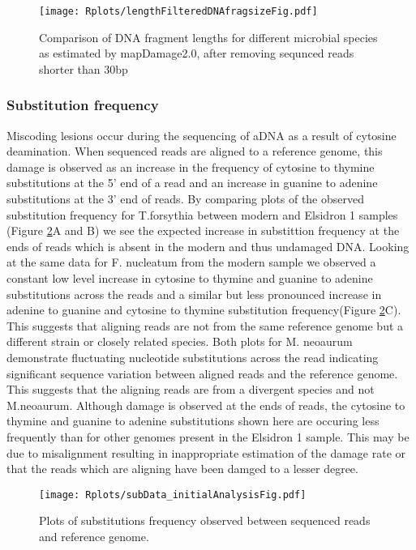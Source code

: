 \documentclass[12pt, a4paper]{article}
\begin{document}
\begin{figure}[ht!]
	\centering
	\texttt{[image: Rplots/lengthFilteredDNAfragsizeFig.pdf]}
	\small\caption{Comparison of DNA fragment lengths for different microbial species as estimated by mapDamage2.0, after removing sequnced reads shorter than 30bp}\label{fig:lengthFilteredDistCompare}
\end{figure}
\clearpage


\subsubsection{Substitution frequency}
Miscoding lesions occur during the sequencing of aDNA as a result of cytosine deamination.
When sequenced reads are aligned to a reference genome, this damage is observed as an increase in the frequency of cytosine to thymine substitutions at the 5' end of a read and an increase in guanine to adenine substitutions at the 3' end of reads.
By comparing plots of the observed substitution frequency for T.forsythia between modern and Elsidron 1 samples (Figure \ref{fig:subDataInitialFig}A and B) we see the expected increase in substittion frequency at the ends of reads which is absent in the modern and thus undamaged DNA.
Looking at the same data for F. nucleatum from the modern sample we observed a constant low level increase in cytosine to thymine and guanine to adenine substitutions across the reads and a similar but less pronounced increase in adenine to guanine and cytosine to thymine substitution frequency(Figure \ref{fig:subDataInitialFig}C). 
This suggests that aligning reads are not from the same reference genome but a different strain or closely related species.
Both plots for M. neoaurum demonstrate fluctuating  nucleotide substitutions across the read indicating significant sequence variation between aligned reads and the reference genome. 
This suggests that the aligning reads are from a divergent species and not M.neoaurum. Although damage is observed at the ends of reads, the cytosine to thymine and guanine to adenine substitutions shown here are occuring less frequently than for other genomes present in the Elsidron 1 sample.
This may be due to misalignment resulting in inappropriate estimation of the damage rate or that the reads which are aligning have been damged to a lesser degree.


\begin{figure}[ht!]
	\centering
	\texttt{[image: Rplots/subData\_initialAnalysisFig.pdf]}
	\small\caption{Plots of substitutions frequency observed between sequenced reads and reference genome.}\label{fig:subDataInitialFig}
\end{figure}
\end{document}
